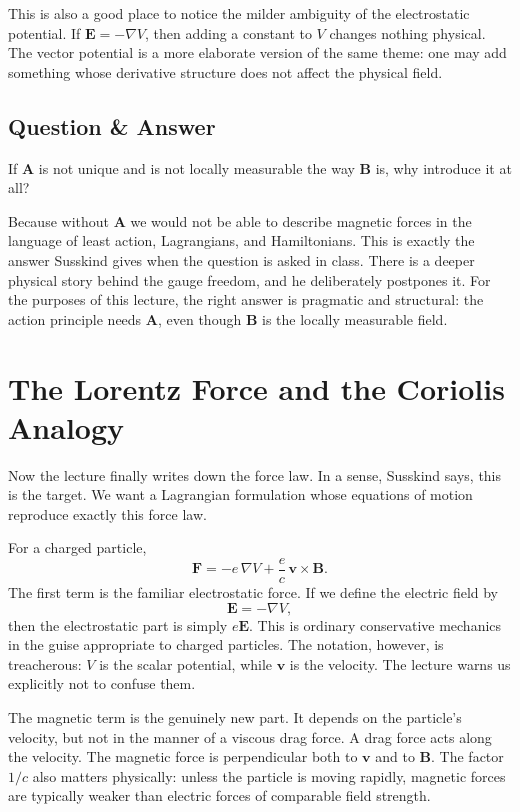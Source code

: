 This is also a good place to notice the milder ambiguity of the electrostatic potential. If \(\mathbf E=-\nabla V\), then adding a constant to \(V\) changes nothing physical. The vector potential is a more elaborate version of the same theme: one may add something whose derivative structure does not affect the physical field.

\subsection{Question \& Answer}

If \(\mathbf A\) is not unique and is not locally measurable the way \(\mathbf B\) is, why introduce it at all?

Because without \(\mathbf A\) we would not be able to describe magnetic forces in the language of least action, Lagrangians, and Hamiltonians. This is exactly the answer Susskind gives when the question is asked in class. There is a deeper physical story behind the gauge freedom, and he deliberately postpones it. For the purposes of this lecture, the right answer is pragmatic and structural: the action principle needs \(\mathbf A\), even though \(\mathbf B\) is the locally measurable field.

\section{The Lorentz Force and the Coriolis Analogy}

Now the lecture finally writes down the force law. In a sense, Susskind says, this is the target. We want a Lagrangian formulation whose equations of motion reproduce exactly this force law.

For a charged particle,
\begin{equation}
\mathbf F=-e\,\nabla V+\frac{e}{c}\,\mathbf v\times \mathbf B.
\end{equation}
The first term is the familiar electrostatic force. If we define the electric field by
\begin{equation}
\mathbf E=-\nabla V,
\end{equation}
then the electrostatic part is simply \(e\mathbf E\). This is ordinary conservative mechanics in the guise appropriate to charged particles. The notation, however, is treacherous: \(V\) is the scalar potential, while \(\mathbf v\) is the velocity. The lecture warns us explicitly not to confuse them.

The magnetic term is the genuinely new part. It depends on the particle's velocity, but not in the manner of a viscous drag force. A drag force acts along the velocity. The magnetic force is perpendicular both to \(\mathbf v\) and to \(\mathbf B\). The factor \(1/c\) also matters physically: unless the particle is moving rapidly, magnetic forces are typically weaker than electric forces of comparable field strength.

